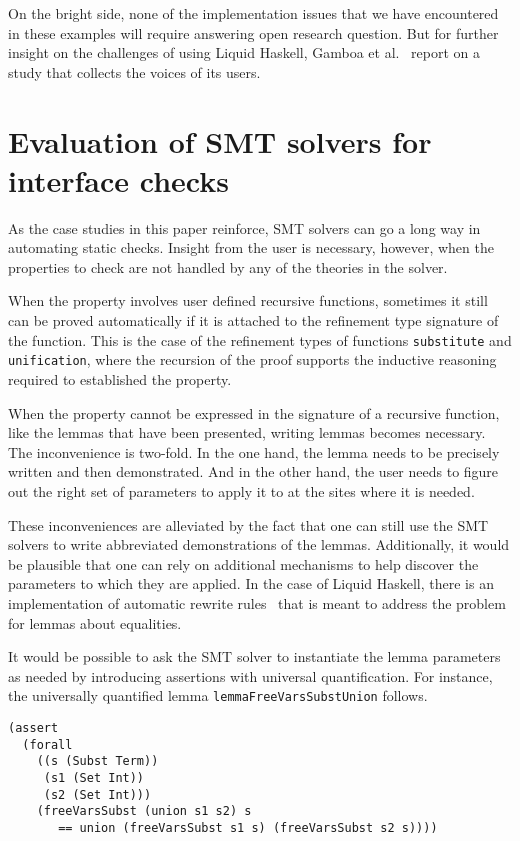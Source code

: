 \documentclass[sigconf, anonymous, review]{acmart}
\newcommand{\tc}[1]{{\small\texttt{#1}}}
\begin{document}
On the bright
side, none of the implementation issues that we have encountered in these
examples will require answering open research question.
But for further insight on the challenges of using Liquid Haskell,
Gamboa et al.~\cite{gamboa25} report on a study that collects the voices
of its users.

\section{Evaluation of SMT solvers for interface checks}
\label{SMT-solvers-for-interface-checks}

As the case studies in this paper reinforce, SMT solvers can go a long way in
automating static checks. Insight from the user is necessary, however,
when the properties to check are not handled by any of the theories in the
solver.

When the property involves user defined recursive functions,
sometimes it still can be proved automatically if it is attached to the
refinement type signature of the function. This is the case of the refinement
types of functions \tc{substitute} and \tc{unification}, where the recursion
of the proof supports the inductive reasoning required to established the
property.

When the property cannot be expressed in the signature of a recursive function,
like the lemmas that have been presented, writing lemmas becomes necessary. The
inconvenience is two-fold. In the one hand, the lemma needs to be precisely
written and then demonstrated. And in the other hand, the user needs to figure
out the right set of parameters to apply it to at the sites where it is needed.

These inconveniences are alleviated by the fact that one can still use the
SMT solvers to write abbreviated demonstrations of the lemmas. Additionally,
it would be plausible that one can rely on additional mechanisms to help
discover the parameters to which they are applied. In the case of Liquid
Haskell, there is an implementation of automatic rewrite rules~\cite{grannan22}
that is meant to address the problem for lemmas about equalities.

It would be possible to ask the SMT solver to instantiate the lemma parameters
as needed by introducing assertions with universal quantification. For instance,
the universally quantified lemma \tc{lemma\-FreeVars\-Subst\-Union} follows.

\begin{verbatim}
(assert
  (forall
    ((s (Subst Term))
     (s1 (Set Int))
     (s2 (Set Int)))
    (freeVarsSubst (union s1 s2) s
       == union (freeVarsSubst s1 s) (freeVarsSubst s2 s))))
\end{verbatim}
\end{document}
